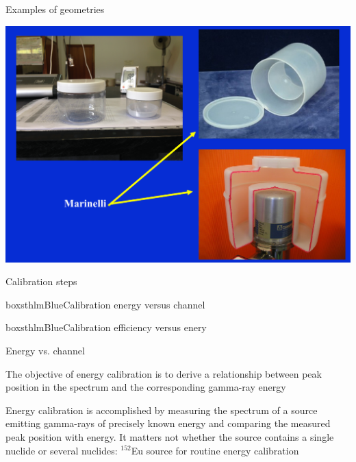 \begin{frame}{Examples of geometries}

\centering
\includegraphics[scale=0.27]{figures/geometries.png}

\end{frame}

\begin{frame}{Calibration steps}

\begin{beamercolorbox}[wd=\linewidth,ht=3ex,dp=3ex]{boxsthlmBlue}\centering Calibration energy versus channel  \end{beamercolorbox}


\begin{beamercolorbox}[wd=\linewidth,ht=3ex,dp=3ex]{boxsthlmBlue}\centering Calibration efficiency versus enery \end{beamercolorbox}


\end{frame}

\begin{frame}{Energy vs. channel}

\alert{The objective of energy calibration is to derive a relationship between peak position in the spectrum and the corresponding gamma-ray energy}


Energy calibration is accomplished by measuring the spectrum of a source emitting gamma-rays of precisely known energy and comparing the measured peak position with energy. It matters not whether the source contains a single nuclide or several nuclides: $^{152}$Eu source for routine energy calibration


\end{frame}

